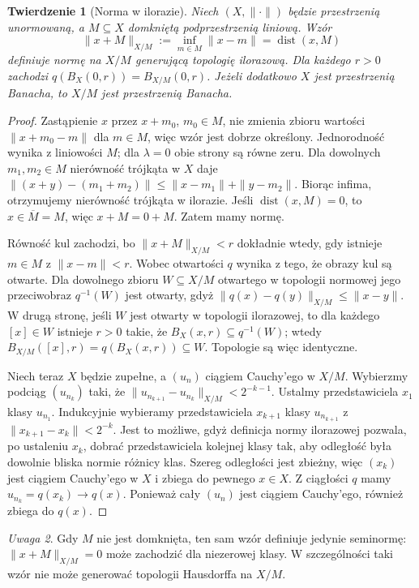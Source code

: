 \documentclass[11pt,a4paper]{article}
\numberwithin{equation}{section}
\theoremstyle{plain}
\newtheorem{twierdzenie}{Twierdzenie}[section]
\theoremstyle{definition}
\theoremstyle{remark}
\newtheorem{uwaga}[twierdzenie]{Uwaga}
\begin{document}
\begin{twierdzenie}[Norma w ilorazie]\label{thm:quotient-norm}
Niech $(X,\|\cdot\|)$ będzie przestrzenią unormowaną,
a $M\subseteq X$ domkniętą podprzestrzenią liniową. Wzór
\[
 \|x+M\|_{X/M}:=\inf_{m\in M}\|x-m\|=\operatorname{dist}(x,M)
\]
definiuje normę na $X/M$ generującą topologię ilorazową.
Dla każdego $r>0$ zachodzi
$q(B_X(0,r))=B_{X/M}(0,r)$.
Jeżeli dodatkowo $X$ jest przestrzenią Banacha,
to $X/M$ jest przestrzenią Banacha.
\end{twierdzenie}
\begin{proof}
Zastąpienie $x$ przez $x+m_0$, $m_0\in M$, nie zmienia
zbioru wartości $\|x+m_0-m\|$ dla $m\in M$, więc wzór
jest dobrze określony. Jednorodność wynika z liniowości $M$;
dla $\lambda=0$ obie strony są równe zeru. Dla dowolnych
$m_1,m_2\in M$ nierówność trójkąta w $X$ daje
$\|(x+y)-(m_1+m_2)\|\leq\|x-m_1\|+\|y-m_2\|$.
Biorąc infima, otrzymujemy nierówność trójkąta w ilorazie.
Jeśli $\operatorname{dist}(x,M)=0$, to $x\in\overline M=M$,
więc $x+M=0+M$. Zatem mamy normę.

Równość kul zachodzi, bo $\|x+M\|_{X/M}<r$ dokładnie
wtedy, gdy istnieje $m\in M$ z $\|x-m\|<r$.
Wobec otwartości $q$ wynika z tego, że obrazy kul
są otwarte. Dla dowolnego zbioru $W\subseteq X/M$
otwartego w topologii normowej jego przeciwobraz
$q^{-1}(W)$ jest otwarty, gdyż
$\|q(x)-q(y)\|_{X/M}\leq\|x-y\|$.
W drugą stronę, jeśli $W$ jest otwarty w topologii ilorazowej,
to dla każdego $[x]\in W$ istnieje $r>0$ takie, że
$B_X(x,r)\subseteq q^{-1}(W)$; wtedy
$B_{X/M}([x],r)=q(B_X(x,r))\subseteq W$.
Topologie są więc identyczne.

Niech teraz $X$ będzie zupełne, a $(u_n)$ ciągiem Cauchy'ego
w $X/M$. Wybierzmy podciąg $(u_{n_k})$ taki, że
$\|u_{n_{k+1}}-u_{n_k}\|_{X/M}<2^{-k-1}$.
Ustalmy przedstawiciela $x_1$ klasy $u_{n_1}$.
Indukcyjnie wybieramy przedstawiciela $x_{k+1}$ klasy
$u_{n_{k+1}}$ z $\|x_{k+1}-x_k\|<2^{-k}$.
Jest to możliwe, gdyż definicja normy ilorazowej
pozwala, po ustaleniu $x_k$, dobrać przedstawiciela
kolejnej klasy tak, aby odległość była dowolnie bliska
normie różnicy klas. Szereg odległości jest zbieżny,
więc $(x_k)$ jest ciągiem Cauchy'ego w $X$ i zbiega
do pewnego $x\in X$. Z ciągłości $q$ mamy
$u_{n_k}=q(x_k)\to q(x)$. Ponieważ cały $(u_n)$
jest ciągiem Cauchy'ego, również zbiega do $q(x)$.
\end{proof}

\begin{uwaga}
Gdy $M$ nie jest domknięta, ten sam wzór definiuje
jedynie seminormę: $\|x+M\|_{X/M}=0$ może zachodzić
dla niezerowej klasy. W szczególności taki wzór nie
może generować topologii Hausdorffa na $X/M$.
\end{uwaga}
\end{document}
